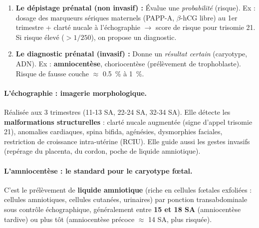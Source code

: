 \documentclass[11pt]{article}
\begin{document}
\begin{aretenir}
\begin{enumerate}
    \item \textbf{Le dépistage prénatal (non invasif) :} Évalue une \emph{probabilité} (risque). Ex : dosage des marqueurs sériques maternels (PAPP-A, $\beta$-hCG libre) au 1er trimestre + clarté nucale à l'échographie $\rightarrow$ score de risque pour trisomie 21. Si risque élevé ($> 1/250$), on propose un diagnostic.
    \item \textbf{Le diagnostic prénatal (invasif) :} Donne un \emph{résultat certain} (caryotype, ADN). Ex : \textbf{amniocentèse}, choriocentèse (prélèvement de trophoblaste). Risque de fausse couche $\approx$ \SI{0,5}{\%} à \SI{1}{\%}.
\end{enumerate}
\end{aretenir}

\paragraph{L'échographie : imagerie morphologique.}
Réalisée aux 3 trimestres (\num{11}-\num{13} SA, \num{22}-\num{24} SA, \num{32}-\num{34} SA). Elle détecte les \textbf{malformations structurelles} : clarté nucale augmentée (signe d'appel trisomie 21), anomalies cardiaques, spina bifida, agénésies, dysmorphies faciales, restriction de croissance intra-utérine (RCIU). Elle guide aussi les gestes invasifs (repérage du placenta, du cordon, poche de liquide amniotique).

\paragraph{L'amniocentèse : le standard pour le caryotype fœtal.}
C'est le prélèvement de \textbf{liquide amniotique} (riche en cellules fœtales exfoliées : cellules amniotiques, cellules cutanées, urinaires) par ponction transabdominale sous contrôle échographique, généralement entre \textbf{\num{15} et \num{18} SA} (amniocentèse tardive) ou plus tôt (amniocentèse précoce $\approx$ \num{14} SA, plus risquée).
\end{document}
